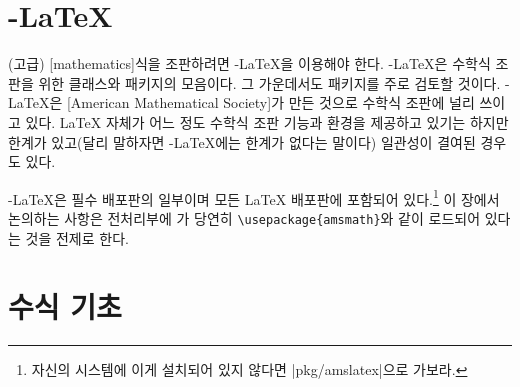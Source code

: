 \section{\texorpdfstring{\AmS}{AmS}-\LaTeX{}}

(고급) [mathematics]식을 조판하려면 \AmS-\LaTeX 을 이용해야 한다.
\AmS-\LaTeX{}은 수학식 조판을 위한 클래스와 패키지의 모음이다. 그 가운데서도  패키지를 
주로 검토할 것이다. \AmS-\LaTeX 은 [American Mathematical Society]가 만든 것으로 
수학식 조판에 널리 쓰이고 있다.
\LaTeX{} 자체가 어느 정도 수학식 조판 기능과 환경을 제공하고 있기는 하지만 한계가 있고(달리 말하자면 \AmS-\LaTeX 에는 한계가 없다는 말이다)
일관성이 결여된 경우도 있다.

\AmS-\LaTeX 은 필수 배포판의 일부이며 모든 \LaTeX{} 배포판에 포함되어 있다.\footnote{%
  자신의 시스템에 이게 설치되어 있지 않다면 \CTAN|pkg/amslatex|으로 가보라.
}
이 장에서 논의하는 사항은 전처리부에 가 당연히 \verb|\usepackage{amsmath}|와 같이 
로드되어 있다는 것을 전제로 한다.

\section{수식 기초}


